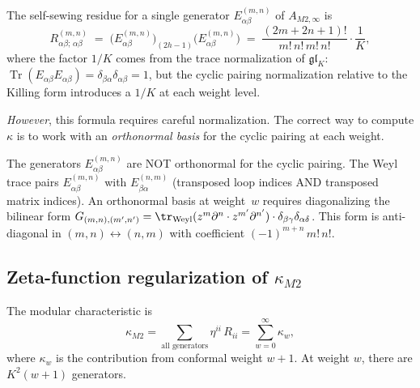 \documentclass[11pt]{article}
\newcommand{\Tr}{\operatorname{Tr}}
\begin{document}
\begin{proposition}
\label{prop:m2-self-sewing}
The self-sewing residue for a single generator
$E^{(m,n)}_{\alpha\beta}$ of $A_{M2,\infty}$ is
\begin{equation}\label{eq:m2-self-sewing-single}
R^{(m,n)}_{\alpha\beta;\,\alpha\beta}
\;=\;
\bigl(E^{(m,n)}_{\alpha\beta}\bigr)_{(2h-1)}
\bigl(E^{(m,n)}_{\alpha\beta}\bigr)
\;=\;
\frac{(2m+2n+1)!}{m!\,n!\,m!\,n!}\cdot\frac{1}{K},
\end{equation}
where the factor $1/K$ comes from the trace normalization
of $\mathfrak{gl}_K$:
$\Tr(E_{\alpha\beta}E_{\alpha\beta})
= \delta_{\beta\alpha}\delta_{\alpha\beta} = 1$,
but the cyclic pairing normalization relative to the Killing
form introduces a $1/K$ at each weight level.

\emph{However}, this formula requires careful normalization.
The correct way to compute $\kappa$ is to work with an
\emph{orthonormal basis} for the cyclic pairing at each weight.
\end{proposition}

\begin{warning}
\label{warn:orthogonalization}
The generators $E^{(m,n)}_{\alpha\beta}$ are NOT orthonormal for
the cyclic pairing.  The Weyl trace pairs
$E^{(m,n)}_{\alpha\beta}$ with
$E^{(n,m)}_{\beta\alpha}$ (transposed loop indices AND
transposed matrix indices).  An orthonormal basis at weight~$w$
requires diagonalizing the bilinear form
$G_{(m,n),(m',n')} =
\tr_{\mathrm{Weyl}}(z^m\partial^n \cdot z^{m'}\partial^{n'})
\cdot \delta_{\beta\gamma}\delta_{\alpha\delta}$.
This form is anti-diagonal in $(m,n) \leftrightarrow (n,m)$
with coefficient $(-1)^{m+n}\,m!\,n!$.
\end{warning}

\subsection{Zeta-function regularization of $\kappa_{M2}$}

The modular characteristic is
\[
\kappa_{M2}
= \sum_{\text{all generators}} \eta^{ii}\, R_{ii}
= \sum_{w=0}^{\infty} \kappa_w,
\]
where $\kappa_w$ is the contribution from conformal weight $w+1$.
At weight $w$, there are $K^2(w+1)$ generators.
\end{document}
